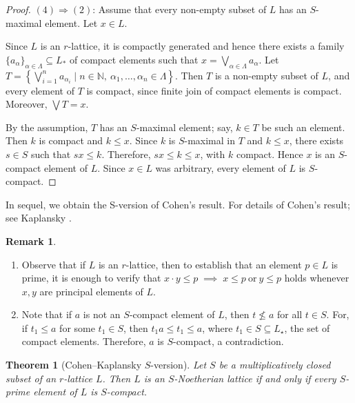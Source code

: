 \documentclass[10pt,twoside,a4]{amsart}
\numberwithin{equation}{section}
\theoremstyle{plain}
\newtheorem{thm}[lem]{Theorem}
\theoremstyle{definition}
\newtheorem{rem}[lem]{Remark}
\begin{document}
\begin{proof}
	$(4) \Rightarrow  (2)$: Assume that every non-empty subset of $L$ has an $S$-maximal element. Let $x\in L$.
	
	Since $L$ is an $r$-lattice, it is compactly generated and hence there exists a family $\{a_\alpha\}_{\alpha\in\Lambda}\subseteq L_*$
	of compact elements such that
	$x=\bigvee_{\alpha\in\Lambda} a_\alpha$. Let
	$T=\left\{\bigvee_{i=1}^n a_{\alpha_i}\mid
	n\in\mathbb{N},\ \alpha_1,\dots,\alpha_n\in\Lambda\right\}$.
	Then $T$ is a non-empty subset of $L$, and every element of $T$ is compact,
	since finite join of compact elements is compact.
	Moreover, $\bigvee T=x$.
	
	By the assumption, $T$ has an $S$-maximal element; say, $k\in T$ be such an element.
	Then $k$ is compact and $k\leq x$. Since $k$ is $S$-maximal in $T$ and $k\leq x$, there exists $s\in S$ such that $sx\leq k$.
	 Therefore, $sx\leq k\leq x$, with $k$ compact.
	Hence $x$ is an $S$-compact element of $L$. Since $x\in L$ was arbitrary, every element of $L$ is $S$-compact.
	\end{proof}


In sequel, we obtain the S-version of Cohen's result. For details of Cohen's result; see Kaplansky \cite[Theorem 8]{kap}.  

\begin{rem}\label{princ-prime}
	\begin{enumerate}
	\item Observe that if $L$ is an $r$-lattice, then to establish that an element 
	$p \in L$ is prime, it is enough to verify that
	$x \cdot y \leq p \;\implies\; x \leq p \ \text{or}\ y \leq p
	$
	holds whenever $x, y$ are principal elements of $L$.
	
	\item Note that if $a$ is not an $S$-compact element of $L$, then $t\nleq a$ for all $t\in S$. For, if $t_1\leq a$ for some $t_1\in S$, then $t_1a\leq t_1\leq a$, where $t_1\in S\subseteq L_{\star}$, the set of compact elements. Therefore, $a$ is  $S$-compact, a contradiction. 
	\end{enumerate}
\end{rem}




\begin{thm}[Cohen--Kaplansky $S$-version]
	Let $S$ be a multiplicatively closed subset of an $r$-lattice $L$. Then $L$ is an $S$-Noetherian lattice if and only if  every $S$-prime element of $L$  is  $S$-compact. 
\end{thm} 
\end{document}
